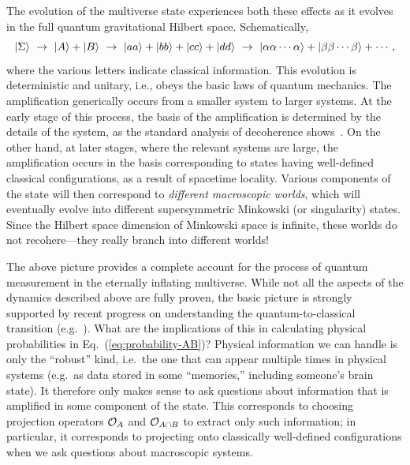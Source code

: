 \documentclass[12pt]{article}
\begin{document}
The evolution of the multiverse state experiences both these effects 
as it evolves in the full quantum gravitational Hilbert space. 
Schematically,
%
\begin{equation}
  \left| \Sigma \right> \,\,\rightarrow\,\, 
    \left| A \right> + \left| B \right> \,\,\rightarrow\,\, 
    \left| aa \right> + \left| bb \right> + \left| cc \right> + \left| dd \right> \,\,\rightarrow\,\, 
    \left| \alpha\alpha\cdots\alpha \right> + \left| \beta\beta\cdots\beta \right> + \cdots,
\label{eq:multiverse-evolve}
\end{equation}
%
where the various letters indicate classical information.  This evolution 
is deterministic and unitary, i.e., obeys the basic laws of quantum 
mechanics.  The amplification generically occurs from a smaller system 
to larger systems.  At the early stage of this process, the basis of the 
amplification is determined by the details of the system, as the standard 
analysis of decoherence shows~\cite{Schlosshauer}.  On the other hand, 
at later stages, where the relevant systems are large, the amplification 
occurs in the basis corresponding to states having well-defined classical 
configurations, as a result of spacetime locality. Various components 
of the state will then correspond to {\it different macroscopic worlds}, 
which will eventually evolve into different supersymmetric Minkowski 
(or singularity) states.  Since the Hilbert space dimension of Minkowski 
space is infinite, these worlds do not recohere---they really branch 
into different worlds!

The above picture provides a complete account for the process of quantum 
measurement in the eternally inflating multiverse.  While not all 
the aspects of the dynamics described above are fully proven, the basic 
picture is strongly supported by recent progress on understanding the 
quantum-to-classical transition (e.g.~\cite{q-Darwinism,Schlosshauer}). 
What are the implications of this in calculating physical probabilities 
in Eq.~(\ref{eq:probability-AB})?  Physical information we can handle 
is only the ``robust'' kind, i.e.\ the one that can appear multiple times 
in physical systems (e.g.\ as data stored in some ``memories,'' including 
someone's brain state).  It therefore only makes sense to ask questions 
about information that is amplified in some component of the state. 
This corresponds to choosing projection operators ${\cal O}_A$ and 
${\cal O}_{A \cap B}$ to extract only such information; in particular, 
it corresponds to projecting onto classically well-defined configurations 
when we ask questions about macroscopic systems.
\end{document}
